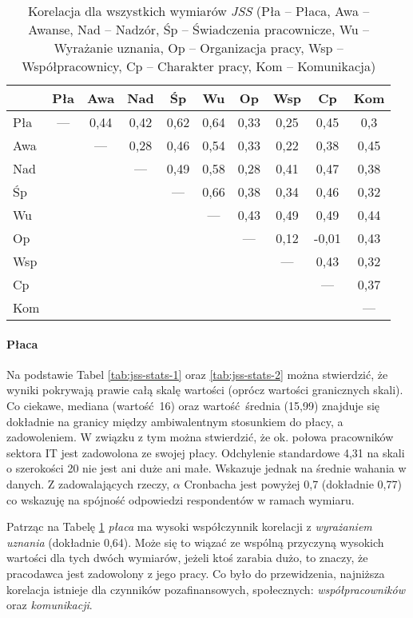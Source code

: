 \begin{table}[h!]
\begin{center}
\begin{tabular} { l | c c c c c c c c c }
 & Pła & Awa & Nad & Śp & Wu & Op & Wsp & Cp & Kom \\ \hline \hline
Pła & --- & 0,44 & 0,42 & 0,62 & 0,64 & 0,33 & 0,25 & 0,45 & 0,3 \\
Awa & & --- & 0,28 & 0,46 & 0,54 & 0,33 & 0,22 & 0,38 & 0,45 \\
Nad & & & --- & 0,49 & 0,58 & 0,28 & 0,41 & 0,47 & 0,38 \\
Śp & & & & --- & 0,66 & 0,38 & 0,34 & 0,46 & 0,32 \\
Wu & & & & & --- & 0,43 & 0,49 & 0,49 & 0,44 \\
Op & & & & & & --- & 0,12 & -0,01 & 0,43 \\
Wsp & & & & & & & --- & 0,43 & 0,32 \\
Cp & & & & & & & & --- & 0,37 \\
Kom & & & & & & & & & ---  \\
\end{tabular}
\end{center}
\caption[Korelacja dla wszystkich wymiarów \emph{JSS}]{Korelacja dla wszystkich wymiarów \emph{JSS} (Pła -- Płaca, Awa -- Awanse, Nad -- Nadzór, Śp -- Świadczenia pracownicze, Wu -- Wyrażanie uznania, Op -- Organizacja pracy, Wsp -- Współpracownicy, Cp -- Charakter pracy, Kom -- Komunikacja)}
\label{tab:jss-correl}
\end{table}

\paragraph{Płaca} Na podstawie Tabel \ref{tab:jss-stats-1} oraz \ref{tab:jss-stats-2} można stwierdzić, że wyniki pokrywają prawie całą skalę wartości (oprócz wartości granicznych skali). Co ciekawe, mediana (wartość 16) oraz wartość średnia (15,99) znajduje się dokładnie na granicy między ambiwalentnym stosunkiem do płacy, a zadowoleniem. W związku z tym można stwierdzić, że ok. połowa pracowników sektora IT jest zadowolona ze swojej płacy. Odchylenie standardowe 4,31 na
skali o szerokości 20 nie jest ani duże ani małe. Wskazuje
jednak na średnie wahania w danych. Z zadowalających rzeczy, $\alpha$ Cronbacha jest powyżej 0,7 (dokładnie 0,77) co wskazuję na spójność odpowiedzi respondentów w ramach wymiaru.

Patrząc na Tabelę \ref{tab:jss-correl} \textit{płaca} ma wysoki współczynnik korelacji z \textit{wyrażaniem uznania} (dokładnie 0,64). Może się to wiązać ze wspólną przyczyną wysokich wartości dla tych dwóch wymiarów, jeżeli ktoś zarabia dużo, to znaczy, że pracodawca jest zadowolony z jego pracy. Co było do przewidzenia, najniższa korelacja istnieje dla czynników pozafinansowych, społecznych: \emph{współpracowników} oraz \emph{komunikacji}.

